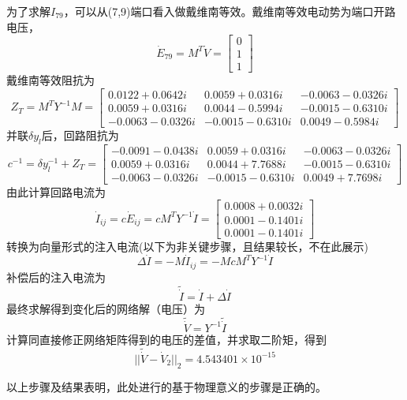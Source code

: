 \documentclass[a4paper,12pt]{article}
\begin{document}
    为了求解$I_{79}$，可以从(7,9)端口看入做戴维南等效。戴维南等效电动势为端口开路电压，
    $$\dot E_{79}=M^T \dot V=\begin{bmatrix}
      0\\1\\1
    \end{bmatrix}$$
    戴维南等效阻抗为
    $$Z_T=M^TY^{-1}M=\begin{bmatrix}
    0.0122 + 0.0642i  & 0.0059 + 0.0316i & -0.0063 - 0.0326i\\
    0.0059 + 0.0316i  & 0.0044 - 0.5994i & -0.0015 - 0.6310i\\
    -0.0063 - 0.0326i & -0.0015 - 0.6310i &  0.0049 - 0.5984i
    \end{bmatrix}$$
    并联$\delta y_l$后，回路阻抗为
    $$c^{-1}=\delta y_l^{-1}+Z_T=\begin{bmatrix}
    -0.0091 - 0.0438i &  0.0059 + 0.0316i & -0.0063 - 0.0326i\\
    0.0059 + 0.0316i &  0.0044 + 7.7688i & -0.0015 - 0.6310i\\
    -0.0063 - 0.0326i & -0.0015 - 0.6310i&   0.0049 + 7.7698i
    \end{bmatrix}$$
    由此计算回路电流为
    $$\dot I_{ij}=c \dot E_{ij}=cM^TY^{-1}\dot I=\begin{bmatrix}
    0.0008 + 0.0032i\\
    0.0001 - 0.1401i\\
    0.0001 - 0.1401i
    \end{bmatrix}$$
    转换为向量形式的注入电流(以下为非关键步骤，且结果较长，不在此展示)
    $$\Delta \dot I=-M\dot I_{ij}=-McM^TY^{-1}\dot I$$
    补偿后的注入电流为
    $$\widetilde {\dot I} = \dot I + \Delta \dot I$$
    最终求解得到变化后的网络解（电压）为
    $$\widetilde {\dot V} = Y^{-1} \widetilde {\dot I}$$
    计算同直接修正网络矩阵得到的电压的差值，并求取二阶矩，得到
    $$||\widetilde {\dot V} - \dot V_2||_2=4.543401\times 10^{-15}$$

    以上步骤及结果表明，此处进行的基于物理意义的步骤是正确的。
    \newpage
    
    
    \appendix
\end{document}
